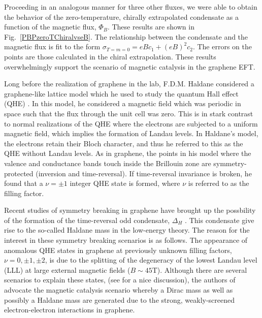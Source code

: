 \documentclass[aps,prd,twocolumn,showpacs,superscriptaddress,groupedaddress]{revtex4}  %
\begin{document}
Proceeding in an analogous manner for three other fluxes, we were able to obtain the behavior of the zero-temperature, chirally extrapolated condensate as a function of the magnetic flux, $\Phi_B$. These results are shown in Fig.~\ref{PBPzeroTChiralvseB}.
The relationship between the condensate and the magnetic flux is fit to the form $\sigma_{T=m=0} = eBc_1 + (eB)^2c_2$. The errors on the points are those calculated in the chiral extrapolation. These results overwhelmingly support the scenario of magnetic catalysis in the graphene EFT.

Long before the realization of graphene in the lab, F.D.M. Haldane considered a graphene-like lattice model which he used to study the quantum Hall effect (QHE) \cite{Haldane}.
In this model, he considered a magnetic field which was periodic in space such that the flux through the unit cell was zero. This is in stark contrast to normal realizations of the QHE 
where the electrons are subjected to a uniform magnetic field, which implies the formation of Landau levels. In Haldane's model, the electrons retain their Bloch character, and thus he referred to 
this as the QHE without Landau levels. As in graphene, the points in his model where the valence and conductance bands touch inside the Brillouin zone are symmetry-protected (inversion and time-reversal).
If time-reversal invariance is broken, he found that a $\nu = \pm 1$ integer QHE state is formed, where $\nu$ is referred to as the filling factor. 

Recent studies of symmetry breaking in graphene have brought up the possbility of the formation of the time-reversal odd condensate, $\Delta_H$ \cite{GonzalezHaldaneMass, MiranskyGraphene2,MiranskyGraphene3}. This condensate give rise to the so-called Haldane mass in the low-energy theory.
The reason for the interest in these symmetry breaking scenarios is as follows.
The appearance of anomalous QHE states in graphene at previously unknown filling factors, $\nu = 0, \pm 1, \pm 2$, is due to the splitting of the degeneracy of the lowest Landau level (LLL) at large external magnetic fields ($B \sim 45 \text{T}$).
Although there are several scenarios to explain these states, (see \cite{Yang} for a nice discussion), the authors of \cite{MiranskyGraphene2, MiranskyGraphene3} advocate the magnetic catalysis scenario whereby a Dirac mass as well as possibly a Haldane mass are generated due to the strong, weakly-screened
electron-electron interactions in graphene.
\end{document}
